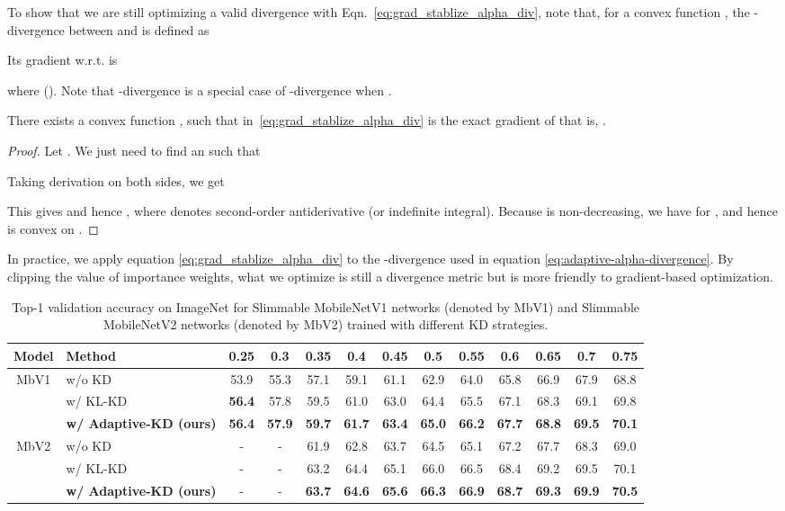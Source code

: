 \documentclass{article}
\begin{document}
To show that we are still optimizing a valid divergence with Eqn.~\eqref{eq:grad_stablize_alpha_div}, note that, for a convex function , 
the -divergence between  and  is defined as 

Its gradient w.r.t.  is 

where  (\citet{wang2018variational}). 
Note that -divergence is a special case of -divergence when 
. 

\begin{pro}
There exists a convex function , such that 
 in~\eqref{eq:grad_stablize_alpha_div} is the exact gradient of  that is, 
. 
\end{pro}
\begin{proof}
Let . 
We just need to find an  such that 

Taking derivation on both sides, we get 

This gives  
and hence ,
where   denotes second-order antiderivative (or indefinite integral). 
Because  is non-decreasing, 
we have  for , and hence  is convex on . 
\end{proof}

In practice, we apply equation \eqref{eq:grad_stablize_alpha_div} to the -divergence used in equation \eqref{eq:adaptive-alpha-divergence}.
By clipping the value of importance weights, what we optimize is still a divergence metric but is more friendly to gradient-based optimization. 

 

\begin{table*}[ht]
\centering
\setlength{\tabcolsep}{4pt}
\begin{tabular}{c|l|ccccccccccc}
\hline
Model & Method & 0.25 &  0.3  &  0.35  &  0.4  &  0.45  & 0.5  &  0.55   &  0.6  & 0.65 & 0.7 & 0.75\\
\hline
\hline
\multirow{3}{*}{MbV1} & w/o KD & 53.9 & 55.3 & 57.1 & 59.1 & 61.1 & 62.9 & 64.0 & 65.8 & 66.9 & 67.9 & 68.8 \\  
&w/ KL-KD  &  \bf 56.4  & 57.8 & 59.5 & 61.0 & 63.0 & 64.4 & 65.5 & 67.1 & 68.3 & 69.1 & 69.8 \\
& \bf w/ Adaptive-KD  (ours) & \bf 56.4 & \bf 57.9 & \bf  59.7 &  \bf 61.7 & \bf  63.4 &  \bf 65.0 &  \bf 66.2 &  \bf 67.7 &  \bf 68.8 &  \bf 69.5 &  \bf 70.1\\ \hline \hline 
\multirow{3}{*}{MbV2} &  w/o KD & - & - & 61.9 & 62.8 & 63.7 & 64.5 & 65.1 & 67.2 & 67.7 & 68.3 & 69.0 \\
& w/ KL-KD  &  - & - &63.2 & 64.4 & 65.1 & 66.0 & 66.5 & 68.4 & 69.2 & 69.5 & 70.1  \\
& \bf  w/ Adaptive-KD  (ours) &  - & - & \bf 63.7 & \bf64.6 &\bf 65.6 & \bf66.3 &\bf 66.9 & \bf68.7 &\bf 69.3 &\bf 69.9 & \bf70.5 \\ \hline 
\end{tabular}
\caption{Top-1 validation accuracy on ImageNet for Slimmable MobileNetV1 networks (denoted by MbV1) and Slimmable MobileNetV2 networks (denoted by MbV2) 
trained with different KD strategies.}
\label{tab:slimmbale}
\end{table*}
\end{document}
